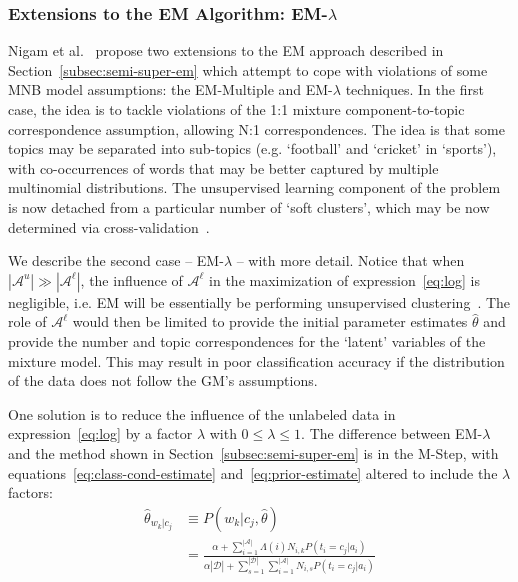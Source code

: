 \subsubsection{Extensions to the EM Algorithm: EM-$\lambda$}
\label{subsubsec:semi-super-em-ext}

Nigam et al.~\cite{Nigam2000} propose two extensions to the EM approach 
described in Section~\ref{subsec:semi-super-em} which attempt to cope with 
violations of some MNB model assumptions: the EM-Multiple and EM-$\lambda$ techniques. 
In the first case, the idea is to tackle violations of the 1:1 mixture 
component-to-topic correspondence assumption, allowing N:1 correspondences. The 
idea is that some topics may be separated into sub-topics (e.g. `football' and 
`cricket' in `sports'), with co-occurrences 
of words that may be better captured by multiple multinomial distributions. The 
unsupervised learning component of the problem is now detached from a particular 
number of `soft clusters', which may be now determined via cross-validation~\cite{Nigam2000}.\vertbreak

We describe the second case -- EM-$\lambda$ -- with more detail. Notice that 
when $|\mathcal{A}^{u}| \gg |\mathcal{A}^{\ell}|$, the influence of 
$\mathcal{A}^{\ell}$ in the maximization of expression~\ref{eq:log} 
is negligible, i.e. EM will be essentially be performing unsupervised 
clustering~\cite{Nigam2000}. The role of $\mathcal{A}^{\ell}$ would then 
be limited to provide the initial parameter estimates $\hat{\theta}$ and 
provide the number and topic correspondences for the `latent' variables of the 
mixture model. This may result in poor classification accuracy if the 
distribution of the data does not follow the GM's assumptions.\vertbreak

One solution is to reduce the influence of the unlabeled data in 
expression~\ref{eq:log} by a factor $\lambda$ with 
$0 \le \lambda \le 1$. The difference between EM-$\lambda$ and the method 
shown in Section~\ref{subsec:semi-super-em} is in the M-Step, with 
equations~\ref{eq:class-cond-estimate} and~\ref{eq:prior-estimate} altered to 
include the $\lambda$ factors:
\begin{equation}
\begin{split}
    \hat{\theta}_{w_k|c_j} &\equiv P(w_k|c_j,\hat{\theta})\\
    &= \frac{\alpha + \sum_{i=1}^{|\mathcal{A}|}\Lambda(i)N_{i,k}P(t_i = c_j|a_i)}{\alpha|\mathcal{D}| + \sum_{s=1}^{|\mathcal{D}|}\sum_{i=1}^{|\mathcal{A}|}N_{i,s}P(t_i = c_j|a_i)}
    \label{eq:class-cond-estimate-lambda}
\end{split}
\end{equation}

